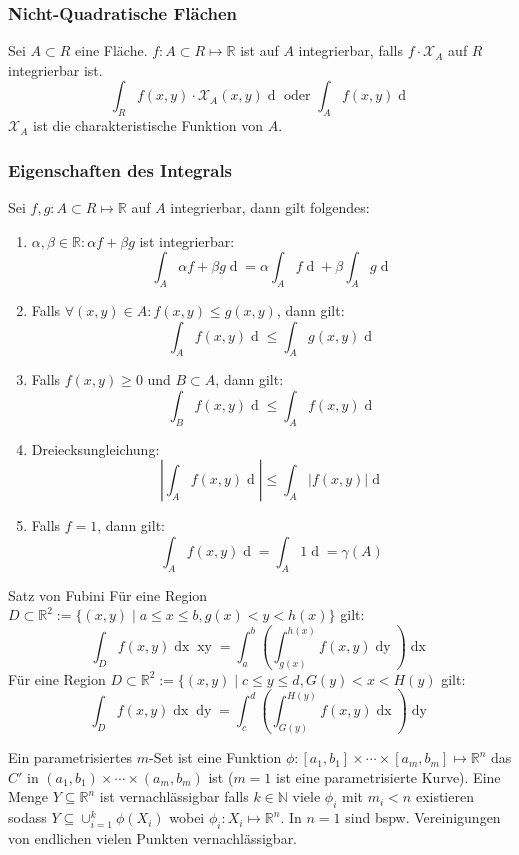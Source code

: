 \documentclass[a4paper,10pt]{article}
\def\R{\mathbb{R}}
\def\N{\mathbb{N}}
\def\X{\mathcal{X}}
\begin{document}
\subsubsection*{Nicht-Quadratische Flächen}
Sei \(A \subset R\) eine Fläche. \(f : A \subset R \mapsto \R\) ist auf \(A\) integrierbar, falls \(f \cdot \X_A\) auf \(R\) integrierbar ist. 
\[\int_R f(x,y) \cdot \X_A(x,y) \mathop{d(x,y)} \text{ oder } \int_A f(x,y) \mathop{d(x,y)}\]
\(\X_A\) ist die charakteristische Funktion von \(A\).

\subsubsection*{Eigenschaften des Integrals}
Sei \(f,g : A \subset R \mapsto \R\) auf \(A\) integrierbar, dann gilt folgendes:
\begin{enumerate}
  \item \(\alpha, \beta \in \R: \alpha f + \beta g\) ist integrierbar:
  \[\int_A \alpha f + \beta g \mathop{d(x,y)} = \alpha \int_A f \mathop{d(x,y)} + \beta \int_A g \mathop{d(x,y)}\]
  \item Falls \(\forall (x,y) \in A: f(x,y) \le g(x,y)\), dann gilt:
  \[\int_A f(x,y) \mathop{d(x,y)} \le \int_A g(x,y) \mathop{d(x,y)}\]
  \item Falls \(f(x,y) \ge 0\) und \(B \subset A\), dann gilt:
  \[\int_B f(x,y) \mathop{d(x,y)} \le \int_A f(x,y) \mathop{d(x,y)}\]
  \item Dreiecksungleichung:
    \[\left| \int_A f(x,y) \mathop{d(x,y)}\right| \le \int_A \left|f(x,y)\right| \mathop{d(x,y)}\]
  \item Falls \(f = 1\), dann gilt:
  \[\int_A f(x,y) \mathop{d(x,y)} = \int_A 1 \mathop{d(x,y)} = \gamma(A)\]
\end{enumerate}


\begin{mainbox}{Satz von Fubini}
  Für eine Region \(D \subset \R^2 := \{\left(x,y\right) \mid a \le x \le b, g(x) < y < h(x)\}\) gilt:
  \[\int_D f(x,y)\mathop{dx} \mathop{xy} = \int_a^b \left(\int_{g(x)}^{h(x)} f(x,y) \mathop{dy}\right)\mathop{dx}\]
  Für eine Region \(D \subset \R^2 := \{ \left(x,y\right) \mid c \le y \le d, G(y) < x < H(y)\) gilt:
  \[\int_D f(x,y) \mathop{dx} \mathop{dy} = \int_c^d \left(\int_{G(y)}^{H(y)} f(x,y)\mathop{dx}\right) \mathop{dy}\]
\end{mainbox}

Ein parametrisiertes $m$-Set ist eine Funktion $\phi: [a_1, b_1] \times \cdots \times [a_m, b_m] \mapsto \R^n$ das $C'$ in $(a_1, b_1) \times \cdots \times (a_m, b_m)$ ist ($m = 1$ ist eine parametrisierte Kurve). Eine Menge $Y \subseteq \R^n$ ist vernachlässigbar falls $k \in \N$ viele $\phi_i$ mit $m_i < n$ existieren sodass $Y \subseteq \cup_{i=1}^k \phi(X_i)$ wobei $\phi_i: X_i \mapsto \R^n$. In $n = 1$ sind bspw. Vereinigungen von endlichen vielen Punkten vernachlässigbar.
\end{document}
